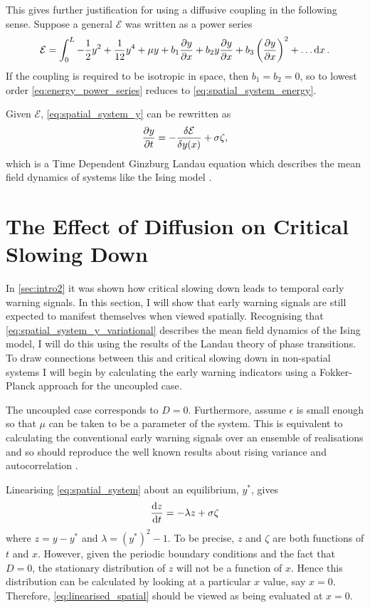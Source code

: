 This gives further justification for using a diffusive coupling in the following sense. Suppose a general $\mathcal{E}$ was written as a power series
\begin{equation}
  \label{eq:energy_power_series}
  \mathcal{E} = \int_0^L  -\frac{1}{2}y^2 + \frac{1}{12}y^4 + \mu y + b_1 \pdv{y}{x} + b_2 y \pdv{y}{x} + b_3 \left(\pdv{y}{x}\right)^2 + \ldots \dd{x}.
\end{equation}
If the coupling is required to be isotropic in space, then $b_1 = b_2 = 0$, so to lowest order \cref{eq:energy_power_series} reduces to
\cref{eq:spatial_system_energy}.

Given $\mathcal{E}$, \cref{eq:spatial_system_y} can be rewritten as
\begin{equation}
  \label{eq:spatial_system_y_variational}
    \pdv{y}{t} = -\fdv{\mathcal{E}}{y(x)}  + \sigma\zeta, 
\end{equation}
which is a Time Dependent Ginzburg Landau equation which describes the mean field dynamics of systems like the Ising model \parencite{Goldenfeld1992}.

\section{The Effect of Diffusion on Critical Slowing Down}
\label{sec:spatial_csd}
In \cref{sec:intro2} it was shown how critical slowing down leads to temporal early warning signals. In this section, I will show that early warning signals are still expected
to manifest themselves when viewed spatially. Recognising that \cref{eq:spatial_system_y_variational} describes the mean field dynamics of
the Ising model, I will do this using the results of the Landau theory of phase transitions. To draw connections between this and critical slowing down in non-spatial systems
I will begin by calculating the early warning indicators using a Fokker-Planck approach for the uncoupled case.

The uncoupled case corresponds to  $D = 0$. Furthermore, assume $\epsilon$ is small enough so that $\mu$ can be taken to be a parameter of the system.
This is equivalent to calculating the conventional early warning signals over an ensemble of realisations and so should reproduce the well known results about rising variance
and autocorrelation \parencite{Dakos2008}.

Linearising \cref{eq:spatial_system} about an equilibrium, $y^*$, gives
\begin{equation}
  \label{eq:linearised_spatial}
  \dv{z}{t} = -\lambda z + \sigma \zeta
\end{equation}
where $z = y - y^*$ and $\lambda = (y^*)^2 - 1$. To be precise, $z$ and $\zeta$ are both functions of $t$ and $x$. However, given the periodic boundary conditions and the
fact that $D = 0$, the stationary distribution of $z$ will not be a function of $x$. Hence this distribution can be calculated by looking at a particular $x$ value, say $x = 0$.
Therefore, \cref{eq:linearised_spatial} should be viewed as being evaluated at $x = 0$.

